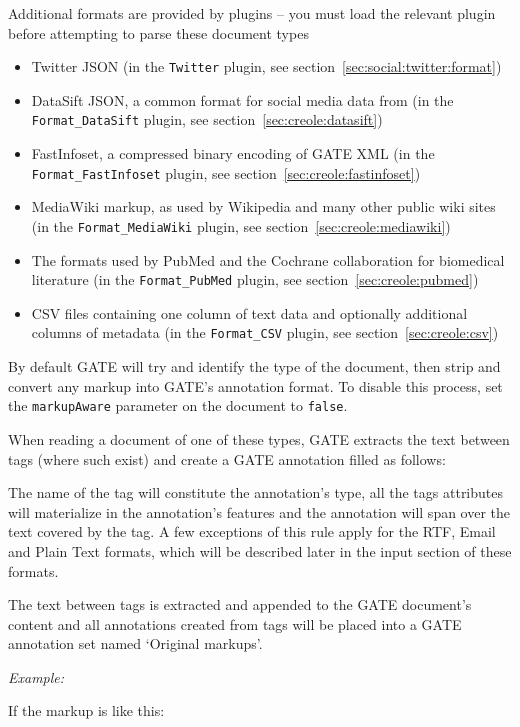 Additional formats are provided by plugins -- you must load the relevant
plugin before attempting to parse these document types
\begin{itemize}
\item Twitter JSON (in the {\tt Twitter} plugin, see
  section~\ref{sec:social:twitter:format})
\item DataSift JSON, a common format for social media data from
   (in the {\tt Format\_DataSift} plugin, see
  section~\ref{sec:creole:datasift})
\item FastInfoset, a compressed binary encoding of GATE XML (in the
  {\tt Format\_FastInfoset} plugin, see section~\ref{sec:creole:fastinfoset})
\item MediaWiki markup, as used by Wikipedia and many other public wiki sites
  (in the {\tt Format\_MediaWiki} plugin, see
  section~\ref{sec:creole:mediawiki})
\item The formats used by PubMed and the Cochrane collaboration for biomedical
  literature (in the {\tt Format\_PubMed} plugin, see
  section~\ref{sec:creole:pubmed})
\item CSV files containing one column of text data and optionally additional
  columns of metadata (in the {\tt Format\_CSV} plugin, see
  section~\ref{sec:creole:csv})
\end{itemize}

By default GATE will try and identify the type of the document, then strip
and convert any markup into GATE's annotation format. To disable this
process, set the {\tt markupAware} parameter on the document to {\tt false}.

When reading a document of one of these types, GATE extracts the text
between tags (where such exist)
and create a GATE annotation filled as follows:

The name of the tag will constitute the annotation's type, all the
tags attributes will materialize in the annotation's features and
the annotation will span over the text covered by the tag. A few
exceptions of this rule apply for the RTF, Email and Plain Text
formats, which will be described later in the input section of
these formats.

The text between tags is extracted and appended to the GATE
document's content and all annotations created from tags will be
placed into a GATE annotation set named `Original markups'.

{\em Example:}

If the markup is like this:

